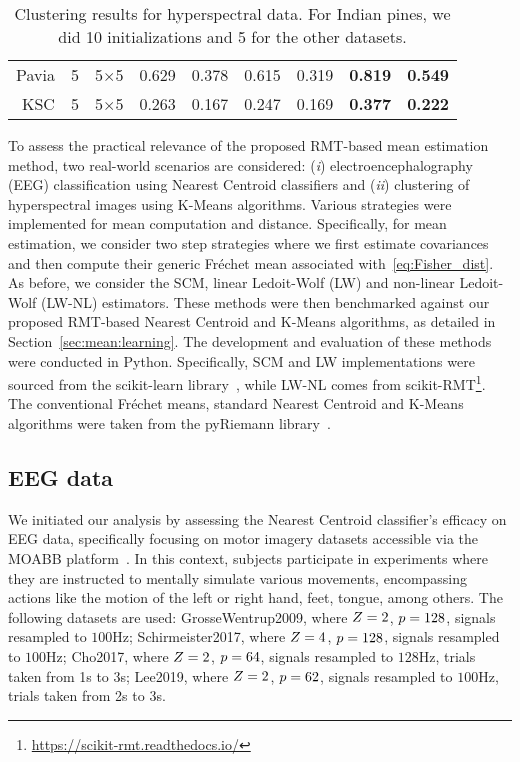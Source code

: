 \documentclass{article}
\theoremstyle{plain}
\theoremstyle{definition}
\theoremstyle{remark}
\begin{document}
\begin{table*}[t]
\begin{tabular}{rcccccccc}
Pavia                         & 5             & 5$\times$5            & 0.629           & 0.378 & 0.615        & 0.319       & \textbf{0.819} & \textbf{0.549} \\ \cline{2-9} 
KSC                           & 5             & 5$\times$5   & 0.263           & 0.167 & 0.247        & 0.169       & \textbf{0.377} & \textbf{0.222}
\end{tabular}
\caption{Clustering results for hyperspectral data. For Indian pines, we did 10 initializations and 5 for the other datasets.}
\label{tab:hyperspectral}
\end{table*}

To assess the practical relevance of the proposed RMT-based mean estimation method, two real-world scenarios are considered:
(\emph{i}) electroencephalography (EEG) classification using Nearest Centroid classifiers and (\emph{ii}) clustering of hyperspectral images using K-Means algorithms.
Various strategies were implemented for mean computation and distance. Specifically, for mean estimation, we consider two step strategies where we first estimate covariances and then compute their generic Fréchet mean associated with~\eqref{eq:Fisher_dist}.
As before, we consider the SCM, linear Ledoit-Wolf (LW) and non-linear Ledoit-Wolf (LW-NL) estimators.
These methods were then benchmarked against our proposed RMT-based Nearest Centroid and K-Means algorithms, as detailed in Section~\ref{sec:mean:learning}. The development and evaluation of these methods were conducted in Python. Specifically, SCM and LW implementations were sourced from the scikit-learn library~\cite{pedregosa2018scikitlearn}, while LW-NL comes from scikit-RMT\footnote{\url{https://scikit-rmt.readthedocs.io/}}. The conventional Fréchet means, standard Nearest Centroid and K-Means algorithms were taken from the pyRiemann library~\cite{alexandre_barachant_2023_8059038}.


\subsection{EEG data}

We initiated our analysis by assessing the Nearest Centroid classifier's efficacy on EEG data, specifically focusing on motor imagery datasets accessible via the MOABB platform~\cite{Aristimunha_Mother_of_all_2023}.
In this context, subjects participate in experiments where they are instructed to mentally simulate various movements, encompassing actions like the motion of the left or right hand, feet, tongue, among others.
The following datasets are used:
GrosseWentrup2009, where $Z=2$, $p=128$, signals resampled to $100$Hz;
Schirmeister2017, where  $Z=4$, $p=128$, signals resampled to $100$Hz;
Cho2017, where  $Z=2$, $p=64$, signals resampled to $128$Hz, trials taken from 1s to 3s;
Lee2019, where  $Z=2$, $p=62$, signals resampled to $100$Hz, trials taken from 2s to 3s.
\end{document}
